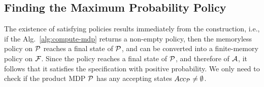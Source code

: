 \documentclass[letterpaper]{article} %
\begin{document}
\subsection{Finding the Maximum Probability Policy}
\label{sec:ValueIteration}
The existence of satisfying policies results immediately from the construction,
i.e., if the Alg.~\ref{alg:compute-mdp} returns a non-empty policy,
then the memoryless policy on $\mathcal{P}$ reaches a final state of $\mathcal{P}$,
and can be converted into a finite-memory policy on $\mathcal{F}$.
Since the policy reaches a final state of $\mathcal{P}$, and therefore of $\mathcal{A}$,
it follows that it satisfies the specification with positive probability.
We only need to check if the product MDP $\mathcal{P}$ has any accepting states $Acc_{\mathcal{P}} \neq \emptyset$.
\end{document}
